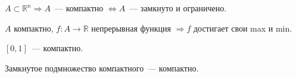 \documentclass[12pt]{article}
\begin{document}
	\begin{theorem}
		$A \subset \mathbb{R}^n \Rightarrow A$~--- компактно $\Leftrightarrow A$~--- замкнуто и ограничено.
	\end{theorem}
	
	\begin{theorem}
		$A$ компактно, $f: A \rightarrow \mathbb{R}$ непрерывная функция $\Rightarrow f$ достигает свои max и min.
	\end{theorem}
	
	\begin{theorem}
		$[0, 1]$~--- компактно.
	\end{theorem}
	
	\begin{theorem}
		Замкнутое подмножество компактного~--- компактно.
	\end{theorem}
	
\end{document}
